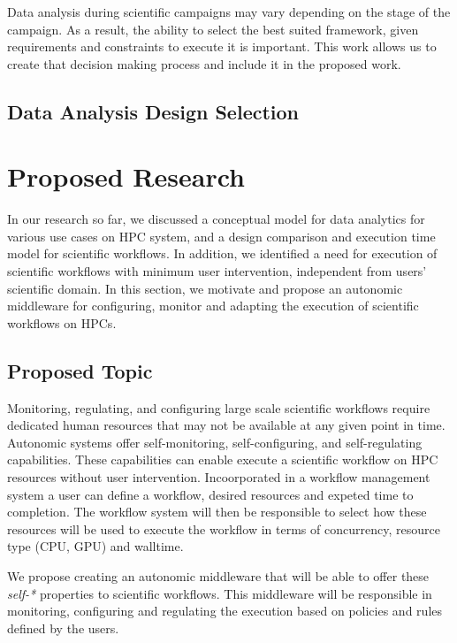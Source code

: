 Data analysis during scientific campaigns may vary depending on the stage of the 
campaign. As a result, the ability to select the best suited framework, given 
requirements and constraints to execute it is important. This work allows us to 
create that decision making process and include it in the proposed work.

\subsection{Data Analysis Design Selection}


\section{Proposed Research}

In our research so far, we discussed a conceptual model for data analytics for 
various use cases on HPC system, and a design comparison and execution time model 
for scientific workflows. In addition, we identified a need for execution of 
scientific workflows with minimum user intervention, independent from users' 
scientific domain. In this section, we motivate and propose an autonomic middleware 
for configuring, monitor and adapting the execution of scientific workflows on 
HPCs.

\subsection{Proposed Topic}

Monitoring, regulating, and configuring large scale scientific workflows require 
dedicated human resources that may not be available at any given point in time. 
Autonomic systems offer self-monitoring, self-configuring, and self-regulating 
capabilities. These capabilities can enable execute a scientific 
workflow on HPC resources without user intervention. Incoorporated in a workflow management system a user can define a workflow, desired resources and expeted time to 
completion. The workflow system will then be responsible 
to select how these resources will be used to execute the workflow in terms of concurrency, 
resource type (CPU, GPU) and walltime.

We propose creating an autonomic middleware that will be able to offer these 
\textit{self-*} properties to scientific workflows. This middleware will be 
responsible in monitoring, configuring and regulating the execution based on 
policies and rules defined by the users. 

